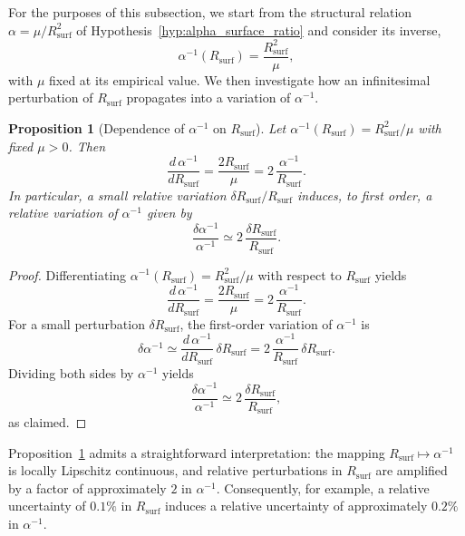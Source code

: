 \documentclass[11pt,a4paper]{article}
\theoremstyle{plain}
\newtheorem{proposition}{Proposition}
\theoremstyle{definition}
\theoremstyle{remark}
\begin{document}
For the purposes of this subsection, we start from the structural relation
\(\alpha = \mu / R_{\mathrm{surf}}^2\) of Hypothesis~\ref{hyp:alpha_surface_ratio} and consider its inverse,
\[
\alpha^{-1}(R_{\mathrm{surf}}) = \frac{R_{\mathrm{surf}}^2}{\mu},
\]
with \(\mu\) fixed at its empirical value. We then investigate how an infinitesimal perturbation of \(R_{\mathrm{surf}}\) propagates into a variation of \(\alpha^{-1}\).

\begin{proposition}[Dependence of \texorpdfstring{\(\alpha^{-1}\)}{alpha^{-1}} on \texorpdfstring{\(R_{\mathrm{surf}}\)}{R\_surf}]
  \label{prop:sensitivity_Rsurf}
  Let \(\alpha^{-1}(R_{\mathrm{surf}}) = R_{\mathrm{surf}}^2 / \mu\) with fixed \(\mu > 0\). Then 
  \[ 
  \frac{d\,\alpha^{-1}}{d R_{\mathrm{surf}}} = \frac{2 R_{\mathrm{surf}}}{\mu} = 2\,\frac{\alpha^{-1}}{R_{\mathrm{surf}}}. 
  \]
In particular, a small relative variation \(\delta R_{\mathrm{surf}} / R_{\mathrm{surf}}\) induces, to first order, a relative variation of \(\alpha^{-1}\) given by 
  \[ 
  \frac{\delta \alpha^{-1}}{\alpha^{-1}} 
  \simeq 2\,\frac{\delta R_{\mathrm{surf}}}{R_{\mathrm{surf}}}.
  \]

\end{proposition}

\begin{proof}
Differentiating \(\alpha^{-1}(R_{\mathrm{surf}}) = R_{\mathrm{surf}}^{2}/\mu\) with respect
to \(R_{\mathrm{surf}}\) yields
\[
\frac{d\,\alpha^{-1}}{d R_{\mathrm{surf}}}
= \frac{2 R_{\mathrm{surf}}}{\mu}
= 2\,\frac{\alpha^{-1}}{R_{\mathrm{surf}}}.
\]
For a small perturbation \(\delta R_{\mathrm{surf}}\), the first-order variation of
\(\alpha^{-1}\) is
\[
\delta \alpha^{-1}
\simeq \frac{d\,\alpha^{-1}}{d R_{\mathrm{surf}}}\,\delta R_{\mathrm{surf}}
= 2\,\frac{\alpha^{-1}}{R_{\mathrm{surf}}}\,\delta R_{\mathrm{surf}}.
\]
Dividing both sides by \(\alpha^{-1}\) yields
\[
\frac{\delta \alpha^{-1}}{\alpha^{-1}}
\simeq 2\,\frac{\delta R_{\mathrm{surf}}}{R_{\mathrm{surf}}},
\]
as claimed.
\end{proof}

Proposition~\ref{prop:sensitivity_Rsurf} admits a straightforward interpretation: the mapping
\(R_{\mathrm{surf}} \mapsto \alpha^{-1}\) is locally Lipschitz continuous, and relative perturbations in
\(R_{\mathrm{surf}}\) are amplified by a factor of approximately \(2\) in
\(\alpha^{-1}\). Consequently, for example, a relative uncertainty of \(0.1\%\) in
\(R_{\mathrm{surf}}\) induces a relative uncertainty of approximately \(0.2\%\) in
\(\alpha^{-1}\).
\end{document}
